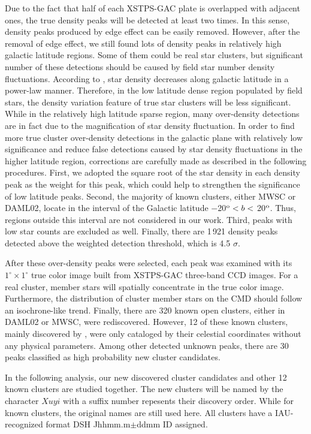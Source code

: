 \documentclass[]{raa_rb}
\begin{document}
Due to the fact that half of each XSTPS-GAC plate is overlapped with adjacent ones, the true density peaks will be detected at least two times. In this sense, density peaks produced by edge effect can be easily removed. However, after the removal of edge effect, we still found lots of density peaks in relatively high galactic latitude regions. Some of them could be real star clusters, but significant number of these detections should be caused by field star number density fluctuations. According to \cite{Gilmore1983}, star density decreases along galactic latitude in a power-law manner. Therefore, in the low latitude dense region populated by field stars, the density variation feature of true star clusters will be less significant. While in the relatively high latitude sparse region, many over-density detections are in fact due to the magnification of star density fluctuation. In order to find more true cluster over-density detections in the galactic plane with relatively low significance and reduce false detections caused by star density fluctuations in the higher latitude region, corrections are carefully made as described in the following procedures. First, we adopted the square root of the star density in each density peak as the weight for this peak, which could help to strengthen the significance of low latitude peaks. Second, the majority of known clusters, either MWSC or DAML02, locate in the interval of the Galactic latitude $-$20$^{\rm o} < b <$ 20$^{\rm o}$. Thus, regions outside this interval are not considered in our work. Third, peaks with low star counts are excluded as well. Finally, there are 1\,921 density peaks detected above the weighted detection threshold, which is 4.5 $\sigma$.



After these over-density peaks were selected, each peak was examined with its $1^{\circ} \times 1^{\circ}$ true color image built from XSTPS-GAC three-band CCD images. For a real cluster, member stars will spatially concentrate in the true color image. Furthermore, the distribution of cluster member stars on the CMD should follow an isochrone-like trend.  Finally, there are 320 known open clusters, either in DAML02 or MWSC, were rediscovered. However, 12 of these known clusters, mainly discovered by \cite{Kronberger2006}, were only cataloged by their celestial coordinates without any physical parameters.  Among other detected unknown peaks, there are 30 peaks classified as high probability new cluster candidates. 

In the following analysis, our new discovered cluster candidates and other 12 known clusters are studied together.  The new clusters will be named by the character $Xuyi$ with a suffix number repesents their discovery order.  While for known clusters, the original names are still used here. All clusters have a IAU-recognized format DSH Jhhmm.m$\pm$ddmm ID assigned.
  
\end{document}
